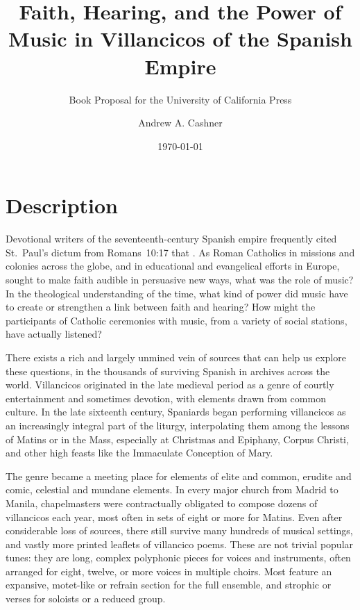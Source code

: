 \documentclass[tt]{vcbook-proposal}
\newcommand{\publisher}{the University of California Press}
\begin{document}
\frontmatter

\begin{titlingpage}
\title    {Faith, Hearing, and the Power of Music 
           in Villancicos of the Spanish Empire}
\subtitle {Book Proposal for \publisher}
\author   {Andrew A. Cashner}
\date     {\today}
\maketitle
\end{titlingpage}

\tableofcontents*

\mainmatter

\section{Description}

Devotional writers of the seventeenth-century Spanish empire frequently cited St.~Paul's dictum from Romans~10:17 that .
As Roman Catholics in missions and colonies across the globe, and in educational and evangelical efforts in Europe, sought to make faith audible in persuasive new ways, what was the role of music?
In the theological understanding of the time, what kind of power did music have to create or strengthen a link between faith and hearing?
How might the participants of Catholic ceremonies with music, from a variety of social stations, have actually listened?

There exists a rich and largely unmined vein of sources that can help us explore these questions, in the thousands of surviving Spanish  in archives across the world.
Villancicos originated in the late medieval period as a genre of courtly entertainment and sometimes devotion, with elements drawn from common culture.
In the late sixteenth century, Spaniards began performing villancicos as an increasingly integral part of the liturgy, interpolating them among the lessons of Matins or in the Mass, especially at Christmas and Epiphany, Corpus Christi, and other high feasts like the Immaculate Conception of Mary.

The genre became a meeting place for elements of elite and common, erudite and comic, celestial and mundane elements.
In every major church from Madrid to Manila, chapelmasters were contractually obligated to compose dozens of villancicos each year, most often in sets of eight or more for Matins.
Even after considerable loss of sources, there still survive many hundreds of musical settings, and vastly more printed leaflets of villancico poems. 
These are not trivial popular tunes: they are long, complex polyphonic pieces for voices and instruments, often arranged for eight, twelve, or more voices in multiple choirs.
Most feature an expansive, motet-like  or refrain section for the full ensemble, and strophic  or verses for soloists or a reduced group.
\end{document}
